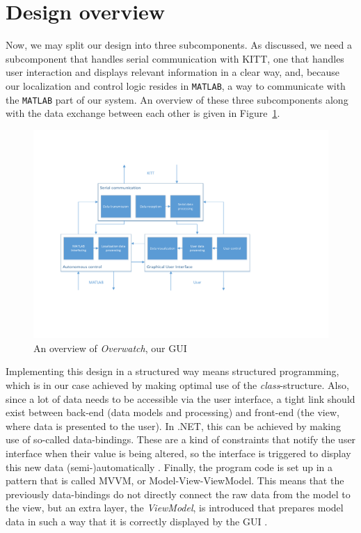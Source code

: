 \documentclass[11pt,titlepage]{report}
\begin{document}
\section{Design overview}
Now, we may split our design into three subcomponents. As discussed, we need a subcomponent that handles serial communication with KITT, one that handles user interaction and displays relevant information in a clear way, and, because our localization and control logic resides in \texttt{MATLAB}, a way to communicate with the \texttt{MATLAB} part of our system.
An overview of these three subcomponents along with the data exchange between each other is given in Figure~\ref{fig:overwatch-overview}.

\begin{figure}[H]
	\centering
	\includegraphics[width=\linewidth]{resource/overwatch-overview.pdf}
	\caption{An overview of \emph{Overwatch}, our GUI}
	\label{fig:overwatch-overview}
\end{figure}

Implementing this design in a structured way means structured programming, which is in our case achieved by making optimal use of the \emph{class}-structure. Also, since a lot of data needs to be accessible via the user interface, a tight link should exist between back-end (data models and processing) and front-end (the view, where data is presented to the user). In .NET, this can be achieved by making use of so-called data-bindings. These are a kind of constraints that notify the user interface when their value is being altered, so the interface is triggered to display this new data (semi-)automatically \cite{data-binding}.
Finally, the program code is set up in a pattern that is called MVVM, or Model-View-ViewModel. This means that the previously data-bindings do not directly connect the raw data from the model to the view, but an extra layer, the \emph{ViewModel}, is introduced that prepares model data in such a way that it is correctly displayed by the GUI \cite{mvvm}.
\end{document}
